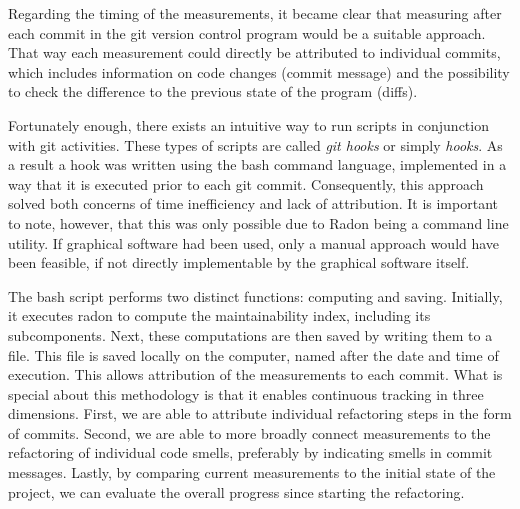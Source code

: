 Regarding the timing of the measurements, it became clear that measuring after each commit in the git version control program would be a suitable approach. That way each measurement could directly be attributed to individual commits, which includes information on code changes (commit message) and the possibility to check the difference to the previous state of the program (diffs). 

Fortunately enough, there exists an intuitive way to run scripts in conjunction with git activities. These types of scripts are called \emph{git hooks} or simply \emph{hooks}. As a result a hook was written using the bash command language, implemented in a way that it is executed prior to each git commit. Consequently, this approach solved both concerns of time inefficiency and lack of attribution. It is important to note, however, that this was only possible due to Radon being a command line utility. If graphical software had been used, only a manual approach would have been feasible, if not directly implementable by the graphical software itself. 

The bash script performs two distinct functions: computing and saving. Initially, it executes radon to compute the maintainability index, including its subcomponents. Next, these computations are then saved by writing them to a file. This file is saved locally on the computer, named after the date and time of execution. This allows attribution of the measurements to each commit. What is special about this methodology is that it enables continuous tracking in three dimensions. First, we are able to attribute individual refactoring steps in the form of commits. Second, we are able to more broadly connect measurements to the refactoring of individual code smells, preferably by indicating smells in commit messages. Lastly, by comparing current measurements to the initial state of the project, we can evaluate the overall progress since starting the refactoring.